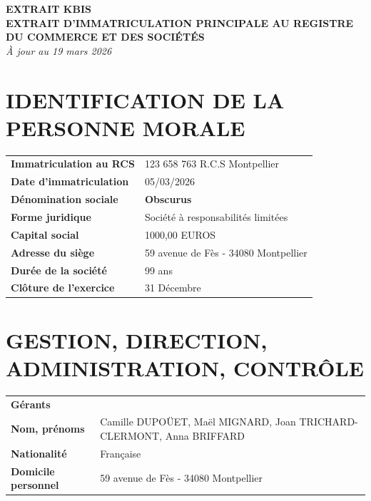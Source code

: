 \documentclass[10pt,a4paper]{article}
\begin{document}
\begin{center}
    \textbf{\huge EXTRAIT KBIS} \\
    \medskip
    \textbf{\small EXTRAIT D’IMMATRICULATION PRINCIPALE AU REGISTRE DU COMMERCE ET DES SOCIÉTÉS} \\
    \textit{À jour au 19 mars 2026}
\end{center}

\vspace{0.8cm}

\section*{IDENTIFICATION DE LA PERSONNE MORALE}
\begin{table}[h!]
\renewcommand{\arraystretch}{1.5}
\begin{tabularx}{\textwidth}{l X}
\textbf{Immatriculation au RCS} & 123 658 763 R.C.S Montpellier \\
\textbf{Date d’immatriculation} & 05/03/2026 \\
\textbf{Dénomination sociale} & \textbf{Obscurus} \\
\textbf{Forme juridique} & Société à responsabilités limitées \\
\textbf{Capital social} & 1000,00 EUROS \\
\textbf{Adresse du siège} & 59 avenue de Fès - 34080 Montpellier \\
\textbf{Durée de la société} & 99 ans \\
\textbf{Clôture de l'exercice} & 31 Décembre \\
\end{tabularx}
\end{table}

\section*{GESTION, DIRECTION, ADMINISTRATION, CONTRÔLE}
\begin{table}[h!]
\renewcommand{\arraystretch}{1.5}
\begin{tabularx}{\textwidth}{l X}
\textbf{Gérants} & \\
\textbf{Nom, prénoms} & Camille DUPOÜET, Maël MIGNARD, Joan TRICHARD-CLERMONT, Anna BRIFFARD \\
\textbf{Nationalité} & Française \\
\textbf{Domicile personnel} & 59 avenue de Fès - 34080 Montpellier \\
\end{tabularx}
\end{table}
\end{document}

